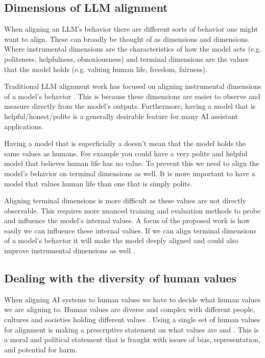 \subsection{Dimensions of LLM alignment}

When aligning an LLM's behavior there are different sorts of behavior one might want to align. These can broadly be thought of as  dimensions and  dimensions. Where instrumental dimensions are the characteristics of how the model acts (e.g. politeness, helpfulness, obnoxiousness) and terminal dimensions are the values that the model holds (e.g. valuing human life, freedom, fairness).

Traditional LLM alignment work has focused on aligning instrumental dimensions of a model's behavior \cite{ouyangTrainingLanguageModels2022,baiConstitutionalAIHarmlessness2022}. This is because these dimensions are easier to observe and measure directly from the model's outputs. Furthermore, having a model that is helpful/honest/polite is a generally desirable feature for many AI assistant applications.

Having a model that is superficially a  doesn't mean that the model holds the same values as humans. For example you could have a very polite and helpful model that believes human life has no value. To prevent this we need to align the model's behavior on terminal dimensions as well. It is more important to have a model that values human life than one that is simply polite.

Aligning terminal dimensions is more difficult as these values are not directly observable. This requires more nuanced training and evaluation methods to probe and influence the model's internal values. A focus of the proposed work is how easily we can influence these internal values. If we can align terminal dimensions of a model's behavior it will make the model deeply aligned and could also improve instrumental dimensions as well \cite{hubingerRisksLearnedOptimization2019}.

\subsection{Dealing with the diversity of human values}

When aligning AI systems to human values we have to decide what human values we are aligning to. Human values are diverse and complex with different people, cultures and societies holding different values \cite{schwartzUniversalsContentStructure1992,schwartzOverviewSchwartzTheory2012}. Using a single set of human values for alignment is making a prescriptive statement on what values are  and . This is a moral and political statement that is fraught with issues of bias, representation, and potential for harm.

